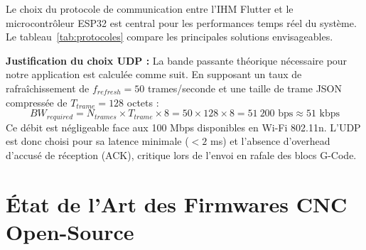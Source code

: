 Le choix du protocole de communication entre l'IHM Flutter et le microcontrôleur ESP32 est central pour les performances temps réel du système. Le tableau~\ref{tab:protocoles} compare les principales solutions envisageables.

\begin{table}[htbp]
\centering
\renewcommand{\arraystretch}{1.3}
\caption{Tableau comparatif des protocoles de communication pour systèmes CNC}
\label{tab:protocoles}
\end{table}

\textbf{Justification du choix UDP :} La bande passante théorique nécessaire pour notre application est calculée comme suit. En supposant un taux de rafraîchissement de $f_{refresh} = 50$ trames/seconde et une taille de trame JSON compressée de $T_{trame} = 128$ octets :
\begin{equation}
    BW_{required} = N_{trames} \times T_{trame} \times 8 = 50 \times 128 \times 8 = \boxed{51~200 \text{ bps} \approx 51 \text{ kbps}}
\end{equation}
Ce débit est négligeable face aux 100 Mbps disponibles en Wi-Fi 802.11n. L'UDP est donc choisi pour sa latence minimale ($< 2$ ms) et l'absence d'overhead d'accusé de réception (ACK), critique lors de l'envoi en rafale des blocs G-Code.

\section{État de l'Art des Firmwares CNC Open-Source}

